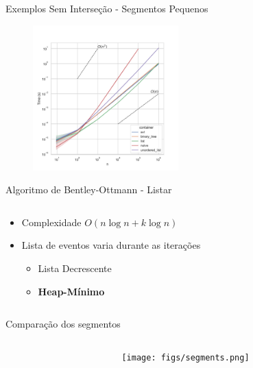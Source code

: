 \documentclass[aspectratio=169,usenames,dvipsnames]{beamer}
\begin{document}
\begin{frame}{Exemplos Sem Interseção - Segmentos Pequenos}
     \begin{figure}
        \includegraphics[width=0.5\textwidth]{figs/tempos/plot_small_detection_time.pdf}
      \end{figure}
\end{frame}


\begin{frame}{Algoritmo de Bentley-Ottmann - Listar}
  \begin{columns}
      \begin{column}{0.5\textwidth}
        \begin{itemize}
          \item Complexidade $O(n \log n + k \log n )$ 
          \item Lista de eventos varia durante as iterações
          \begin{itemize}
            \item Lista Decrescente
            \item \textbf{Heap-Mínimo}
          \end{itemize}
        \end{itemize}
      \end{column}
      \begin{column}{0.5\textwidth}
      \end{column}
  \end{columns}
\end{frame}

\begin{frame}{Comparação dos segmentos}
  \begin{columns}
      \begin{column}{0.5\textwidth}
      \end{column}
      \begin{column}{0.5\textwidth}
        \begin{figure}
        \texttt{[image: figs/segments.png]}
        \end{figure}
      \end{column}
  \end{columns}
\end{frame}
\end{document}
